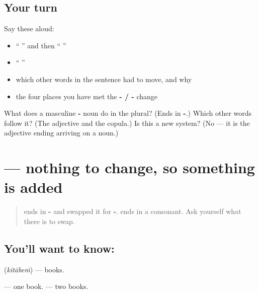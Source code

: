 \subsection*{Your turn}
Say these aloud:

\begin{itemize}
\raggedright
  \item \textquotedblleft{} \textquotedblright{} and then \textquotedblleft{} \textquotedblright{}
  \item \textquotedblleft{}  \textquotedblright{}
  \item which other words in the sentence had to move, and why
  \item the four places you have met the \textbf{- / -} change
\end{itemize}

\begin{tcolorbox}[breakable,colback=teal!4,colframe=teal!35!black,title={Before you move on}]
What does a masculine \textbf{-} noun do in the plural? (Ends in \textbf{-}.) Which other words follow it? (The adjective and the copula.) Is this a new system? (No — it is the adjective ending arriving on a noun.)
\end{tcolorbox}
\section[\texorpdfstring{\hi{किताबें} (kitābeṁ)}{किताबें (kitābeṁ)}]{ — nothing to change, so something is added}

\label{lesson:HI-C91-kitaben}



\begin{quote}
\textbf{} ends in \textbf{-} and swapped it for \textbf{-}. \textbf{} ends in a consonant. Ask yourself what there is to swap.
\end{quote}

\subsection*{You'll want to know: }
\textbf{} (\emph{kitābeṁ}) — books.

\textbf{ } — one book. \textbf{ } — two books.

